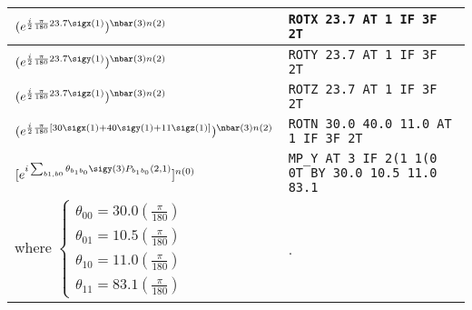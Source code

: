\documentclass[10pt]{article}
\begin{document}
\begin{center}
\begin{tabular}{|l|l|}
\hline
$(e^{\frac{i}{2} \frac{\pi}{180} 23.7 \sigx(1)})^{\nbar(3)n(2)}$ &
{\tt  ROTX  23.7  AT  1  IF  3F  2T}\\
\hline
$(e^{\frac{i}{2}  \frac{\pi}{180} 23.7 \sigy(1)})^{\nbar(3)n(2)}$ &
{\tt  ROTY  23.7  AT  1  IF  3F  2T} \\
\hline
$(e^{\frac{i}{2}  \frac{\pi}{180} 23.7 \sigz(1)})^{\nbar(3)n(2)}$ &
{\tt  ROTZ  23.7  AT  1  IF  3F  2T}\\
\hline
$(e^{
\frac{i}{2}  \frac{\pi}{180}
[30\sigx(1)+ 40\sigy(1) + 11 \sigz(1)]
 })^{\nbar(3)n(2)}$ &
{\tt  ROTN  30.0 40.0 11.0  AT  1  IF  3F  2T}\\
\hline
$[e^{i\sum_{b1,b0}\theta_{b_1b_0}\sigy(3)P_{b_1b_0}(2,1)}]^{n(0)}$
&
{\tt MP\_Y  AT  3 IF 2(1 1(0 0T BY 30.0 10.5 11.0 83.1}
\\
where $\left\{\begin{array}{l}
\theta_{00}=30.0(\frac{\pi}{180})
\\
\theta_{01}=10.5(\frac{\pi}{180})
\\
\theta_{10}=11.0(\frac{\pi}{180})
\\
\theta_{11}=83.1(\frac{\pi}{180})
\end{array}\right.$
&.
\\
\hline
\end{tabular}
\end{center}
\end{document}
